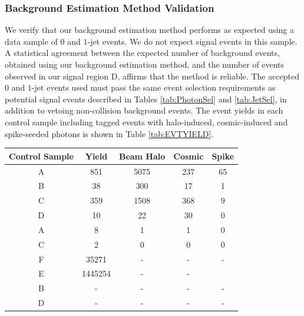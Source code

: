 \subsubsection{Background Estimation Method Validation}
We verify that our background estimation method performs as expected using a data sample of $0$ and $1$-jet events. We do not expect signal events in this sample.
A statistical agreement between the expected number of background events, obtained using our background estimation method, and the number of events observed in our signal region \textsf{D}, affirms that the method is reliable. The accepted $0$ and $1$-jet events used must pass the same event selection requirements as potential signal events described in Tables \ref{tab:PhotonSel} and \ref{tab:JetSel}, in addition to vetoing non-collision background events. The event yields in each control sample including tagged events with halo-induced, cosmic-induced and spike-seeded photons is shown in Table \ref{tab:EVTYIELD}.

\vspace{5mm}
\begin{minipage}{0.90\linewidth} 
\begin{center}
\begin{tabular}{c| c| c| c| c }
\toprule
 \hline
\bfseries{Control Sample} & Yield & Beam Halo & Cosmic & Spike \\
\hline
\toprule
\textsf{A} & 851 & 5075 & 237 & 65\\
\textsf{B} & 38 & 300&  17 &  1\\
\textsc{C} & 359 & 1508 & 368 & 9  \\
\textsf{D} & 10 & 22 & 30 & 0 \\
\hline\hline
\textsf{A}& 8 &  1& 1 & 0\\ 
\textsf{C}& 2 & 0 & 0 & 0\\  
\textsf{F} & 35271& -& - & -\\    
\textsf{E}&  1445254 & - & - & \\       
\textsf{B}& - &-  & - & -\\    
\textsf{D}& - & - & - & -\\      
\hline
\bottomrule
\end{tabular}
\label{tab:EVTYIELD} 
\end{center}
\end{minipage}

